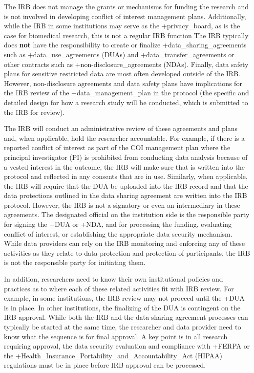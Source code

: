 \documentclass[
]{WileySix}
\begin{document}
The IRB does not manage the grants or mechanisms for funding the research and is not involved in developing conflict of interest management plans. Additionally, while the IRB in some institutions may serve as the +privacy\_board\textbar, as is the case for biomedical research, this is not a regular IRB function The IRB typically does \textbf{not} have the responsibility to create or finalize +data\_sharing\_agreements\textbar{} such as +data\_use\_agreements\textbar{} (DUAs) and +data\_transfer\_agreements\textbar{} or other contracts such as +non-disclosure\_agreements\textbar{} (NDAs). Finally, data safety plans for sensitive restricted data are most often developed outside of the IRB. However, non-disclosure agreements and data safety plans have implications for the IRB review of the +data\_management\_plan\textbar{} in the protocol (the specific and detailed design for how a research study will be conducted, which is submitted to the IRB for review).

The IRB will conduct an administrative review of these agreements and plans and, when applicable, hold the researcher accountable. For example, if there is a reported conflict of interest as part of the COI management plan where the principal investigator (PI) is prohibited from conducting data analysis because of a vested interest in the outcome, the IRB will make sure that is written into the protocol and reflected in any consents that are in use. Similarly, when applicable, the IRB will require that the DUA be uploaded into the IRB record and that the data protections outlined in the data sharing agreement are written into the IRB protocol. However, the IRB is not a signatory or even an intermediary in these agreements. The designated official on the institution side is the responsible party for signing the +DUA\textbar{} or +NDA\textbar, and for processing the funding, evaluating conflict of interest, or establishing the appropriate data security mechanism. While data providers can rely on the IRB monitoring and enforcing any of these activities as they relate to data protection and protection of participants, the IRB is not the responsible party for initiating them.

In addition, researchers need to know their own institutional policies and practices as to where each of these related activities fit with IRB review. For example, in some institutions, the IRB review may not proceed until the +DUA\textbar{} is in place. In other institutions, the finalizing of the DUA is contingent on the IRB approval. While both the IRB and the data sharing agreement processes can typically be started at the same time, the researcher and data provider need to know what the sequence is for final approval. A key point is in all research requiring approval, the data security evaluation and compliance with +FERPA\textbar{} or the +Health\_Insurance\_Portability\_and\_Accountability\_Act\textbar{} (HIPAA) regulations must be in place before IRB approval can be processed.
\end{document}
